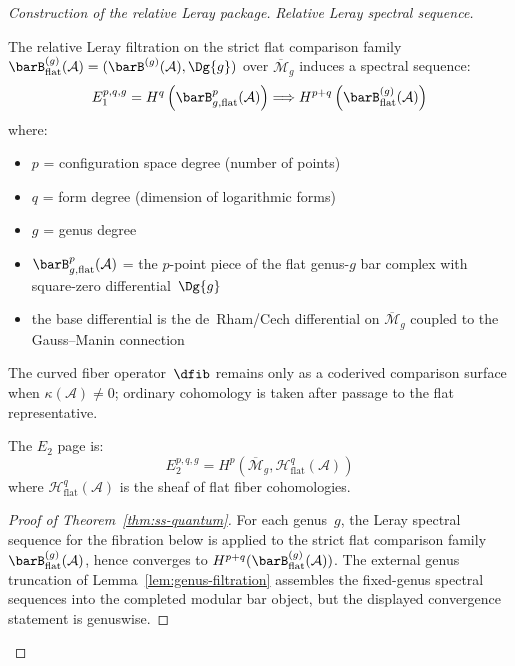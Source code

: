 \begin{proof}[Construction of the relative Leray package]
\emph{Relative Leray spectral sequence.}

\begin{theorem}
\label{thm:ss-quantum}
The relative Leray filtration on the strict flat comparison family
$\barB^{(g)}_{\mathrm{flat}}(\mathcal{A})
= (\barB^{(g)}(\mathcal{A}), \Dg{g})$
over $\overline{\mathcal{M}}_g$ induces a spectral sequence:
\begin{equation}
E_1^{p,q,g} = H^q\left(\barB^p_{g,\mathrm{flat}}(\mathcal{A})\right)
\Longrightarrow
H^{p+q}\left(\barB^{(g)}_{\mathrm{flat}}(\mathcal{A})\right)
\end{equation}
where:
\begin{itemize}
\item $p$ = configuration space degree (number of points)
\item $q$ = form degree (dimension of logarithmic forms)
\item $g$ = genus degree
\item $\barB^p_{g,\mathrm{flat}}(\mathcal{A})$ = the $p$-point piece of the
 flat genus-$g$ bar complex with square-zero differential~$\Dg{g}$
\item the base differential is the de~Rham/Cech differential on
 $\overline{\mathcal{M}}_g$ coupled to the Gauss--Manin connection
\end{itemize}
The curved fiber operator~$\dfib$ remains only as a coderived
comparison surface when $\kappa(\mathcal{A}) \neq 0$; ordinary
cohomology is taken after passage to the flat representative.

The $E_2$ page is:
\begin{equation}
E_2^{p,q,g} = H^p\left(\overline{\mathcal{M}}_g, \mathcal{H}^q_{\mathrm{flat}}(
\mathcal{A})\right)
\end{equation}
where $\mathcal{H}^q_{\mathrm{flat}}(\mathcal{A})$ is the sheaf of
flat fiber cohomologies.
\end{theorem}

\begin{proof}[Proof of Theorem~\ref{thm:ss-quantum}]
For each genus~$g$, the Leray spectral sequence for the fibration
below is applied to the strict flat comparison family
$\barB^{(g)}_{\mathrm{flat}}(\mathcal{A})$, hence converges to
$H^{p+q}(\barB^{(g)}_{\mathrm{flat}}(\mathcal{A}))$.
The external genus truncation of
Lemma~\ref{lem:genus-filtration} assembles the fixed-genus spectral
sequences into the completed modular bar object, but the displayed
convergence statement is genuswise.


\end{proof}
\end{proof}
